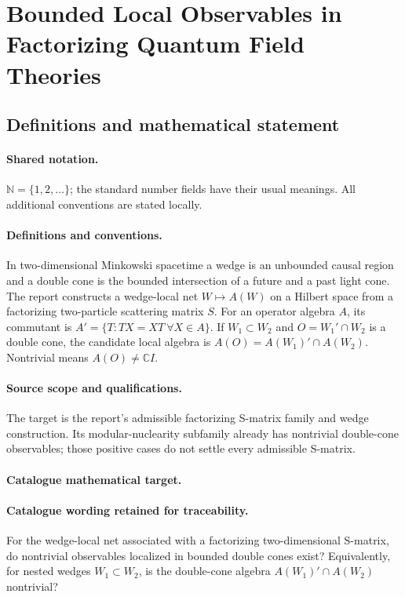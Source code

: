 \documentclass[11pt]{article}
\begin{document}
\section{Bounded Local Observables in Factorizing Quantum Field Theories}\label{statement}

\subsection{Definitions and mathematical statement}

\paragraph{Shared notation.}$\mathbb N=\{1,2,\ldots\}$; the standard number fields have their usual meanings. All additional conventions are stated locally.


\paragraph{Definitions and conventions.} In two-dimensional Minkowski spacetime a wedge is an unbounded causal region and a double cone is the bounded intersection of a future and a past light cone. The report constructs a wedge-local net $W\mapsto A(W)$ on a Hilbert space from a factorizing two-particle scattering matrix $S$. For an operator algebra $A$, its commutant is $A'=\{T:TX=XT\ \forall X\in A\}$. If $W_1\subset W_2$ and $O=W_1'\cap W_2$ is a double cone, the candidate local algebra is $A(O)=A(W_1)'\cap A(W_2)$. Nontrivial means $A(O)\ne\mathbb C I$.

\paragraph{Source scope and qualifications.} The target is the report's admissible factorizing S-matrix family and wedge construction. Its modular-nuclearity subfamily already has nontrivial double-cone observables; those positive cases do not settle every admissible S-matrix.

\paragraph{Catalogue mathematical target.}
\paragraph{Catalogue wording retained for traceability.}
For the wedge-local net associated with a factorizing two-dimensional S-matrix, do nontrivial observables localized in bounded double cones exist? Equivalently, for nested wedges $W_1\subset W_2$, is the double-cone algebra $A(W_1)'\cap A(W_2)$ nontrivial?
\end{document}
